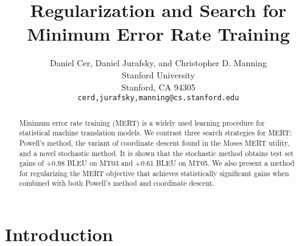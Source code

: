 \documentclass[11pt,tightenlines,kern-1pt]{article}
\title{Regularization and Search for Minimum Error Rate Training}
\author{
Daniel Cer\textnormal{,} Daniel Jurafsky\textnormal{, and} Christopher D. Manning\\
Stanford University\\
Stanford, CA 94305\\
{\tt {cerd,jurafsky,manning}@cs.stanford.edu}
}
\date{}
\begin{document}
\maketitle
\begin{abstract}
Minimum error rate training (MERT) is a widely used learning procedure for statistical machine translation models. We contrast three search strategies for MERT: Powell's method, the variant of coordinate descent found in the Moses MERT utility, and a novel stochastic method. It is shown that the stochastic method obtains test set gains of +0.98 BLEU on MT03 and +0.61 BLEU on MT05. We also present a method for regularizing the MERT objective that achieves statistically significant gains when combined with both Powell's method and coordinate descent.
 
\end{abstract}

\section{Introduction}
\end{document}
